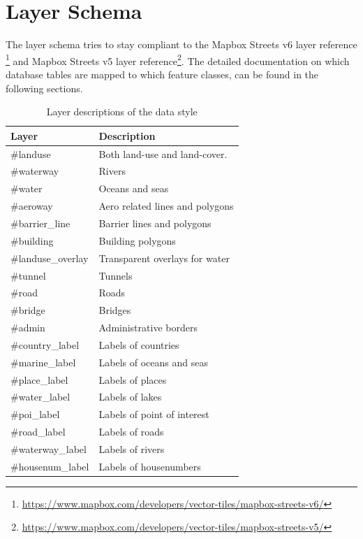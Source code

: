 \newpage
\section{Layer Schema}\label{layer-schema}

The layer schema tries to stay compliant to the Mapbox Streets v6 layer reference \footnote{\url{https://www.mapbox.com/developers/vector-tiles/mapbox-streets-v6/}} and Mapbox Streets v5 layer reference\footnote{\url{https://www.mapbox.com/developers/vector-tiles/mapbox-streets-v5/}}. The detailed documentation on which database tables are mapped to which feature classes, can be found in the following sections.

\begin{table}[H]
\centering
    \begin{tabular}{ll}
    \hline
     Layer             & Description                     \\
    \hline
    \#landuse          & Both land-use and land-cover.   \\
    \#waterway         & Rivers                          \\
    \#water            & Oceans and seas                 \\
    \#aeroway          & Aero related lines and polygons \\
    \#barrier\_line    & Barrier lines and polygons      \\
    \#building         & Building polygons               \\
    \#landuse\_overlay & Transparent overlays for water  \\
    \#tunnel           & Tunnels                         \\
    \#road             & Roads                           \\
    \#bridge           & Bridges                         \\
    \#admin            & Administrative borders          \\
    \#country\_label   & Labels of countries             \\
    \#marine\_label    & Labels of oceans and seas       \\
    \#place\_label     & Labels of places                \\
    \#water\_label     & Labels of lakes                 \\
    \#poi\_label       & Labels of point of interest     \\
    \#road\_label      & Labels of roads                 \\
    \#waterway\_label  & Labels of rivers                \\
    \#housenum\_label  & Labels of housenumbers          \\
    \end{tabular}
    \caption{Layer descriptions of the data style}
\end{table}

